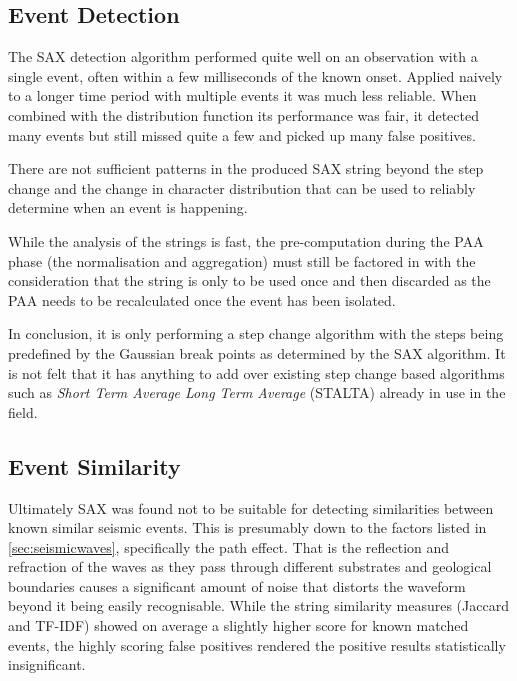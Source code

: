 \documentclass[../report.tex]{subfiles}
\begin{document}
\subsection{Event Detection}

	The SAX detection algorithm performed quite well on an observation with a single event, often within a few milliseconds of the known onset.  Applied naively to a longer time period with multiple events it was much less reliable.  When combined with the distribution function its performance was fair, it detected many events but still missed quite a few and picked up many false positives.
	
	There are not sufficient patterns in the produced SAX string beyond the step change and the change in character distribution that can be used to reliably determine when an event is happening.
	
	While the analysis of the strings is fast, the pre-computation during the PAA phase (the normalisation and aggregation) must still be factored in with the consideration that the string is only to be used once and then discarded as the PAA needs to be recalculated once the event has been isolated.
	
	In conclusion, it is only performing a step change algorithm with the steps being predefined by the Gaussian break points as determined by the SAX algorithm.  It is not felt that it has anything to add over existing step change based algorithms such as \textit{Short Term Average Long Term Average} (STALTA) already in use in the field.


\subsection{Event Similarity}

	Ultimately SAX was found not to be suitable for detecting similarities between known similar seismic events.  This is presumably down to the factors listed in \cref{sec:seismicwaves}, specifically the path effect.  That is the reflection and refraction of the waves as they pass through different substrates and geological boundaries causes a significant amount of noise that distorts the waveform beyond it being easily recognisable.  While the string similarity measures (Jaccard and TF-IDF) showed on average a slightly higher score for known matched events, the highly scoring false positives rendered the positive results statistically insignificant.
	
\end{document}
